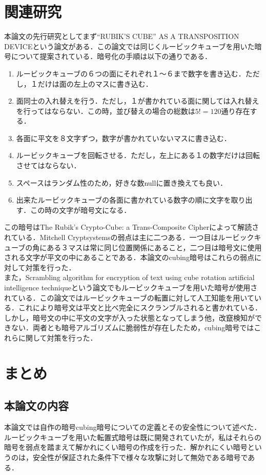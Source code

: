\documentclass[titlepage]{jarticle}
\begin{document}
\section{関連研究}
本論文の先行研究としてまず“RUBIK'S CUBE” AS A TRANSPOSITION DEVICE\cite{Mitchell}という論文がある．この論文では同じくルービックキューブを用いた暗号について提案されている．暗号化の手順は以下の通りである．
\begin{enumerate}
  \item ルービックキューブの６つの面にそれぞれ１〜６まで数字を書き込む．ただし，１だけは面の左上のマスに書き込む．
  \item 面同士の入れ替えを行う．ただし，１が書かれている面に関しては入れ替えを行ってはならない．この時，並び替えの場合の総数は\(5!=120\)通り存在する．
  \item 各面に平文を８文字ずつ，数字が書かれていないマスに書き込む．
  \item ルービックキューブを回転させる．ただし，左上にある１の数字だけは回転させてはならない．
  \item スペースはランダム性のため，好きな数nullに置き換えても良い．
  \item 出来たルービックキューブの各面に書かれている数字の順に文字を取り出す．この時の文字が暗号文になる．
\end{enumerate}
この暗号はThe Rubik's Crypto-Cube: a Trans-Composite Cipher\cite{Trans-Composite Cipher}によって解読されている．Mitchell Cryptsystemsの弱点は主に二つある．一つ目はルービックキューブの角にある３マスは常に同じ位置関係にあること，二つ目は暗号文に使用される文字が平文の中にあることである．本論文のcubing暗号はこれらの弱点に対して対策を行った．\\
また，Scrambling algorithm for encryption of text using cube rotation artificial intelligence technique\cite{Scrambling algorithm}という論文でもルービックキューブを用いた暗号が使用されている．この論文ではルービックキューブの転置に対して人工知能を用いている．これにより暗号文は平文と比べ完全にスクランブルされると書かれている．しかし，暗号文の中に平文の文字が入った状態となってしまう他，改竄検知ができない．両者とも暗号アルゴリズムに脆弱性が存在したため，cubing暗号ではこれらに関して対策を行った．

\section{まとめ}

\subsection{本論文の内容}
本論文では自作の暗号cubing暗号についての定義とその安全性について述べた．ルービックキューブを用いた転置式暗号は既に開発されていたが，私はそれらの暗号を弱点を踏まえて解かれにくい暗号の作成を行った．解かれにくい暗号というのは，安全性が保証された条件下で様々な攻撃に対して無効である暗号である．
\end{document}

